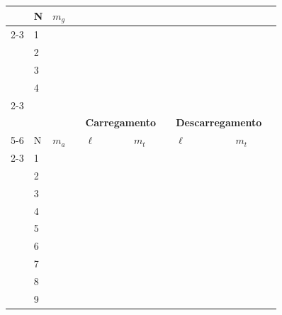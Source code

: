 \begin{table}
	\begin{center}
		\begin{tabular}{llp{25mm}lp{25mm}p{25mm}lp{25mm}p{25mm}l}
		\toprule
		& N\textordmasculine & \textbf{$m_g$} & \\
		\cmidrule{2-3}
		& 1 & \cellcolor[gray]{0.89} \\
		& 2 & \cellcolor[gray]{0.95} \\
		& 3 & \cellcolor[gray]{0.89} \\
		& 4 & \cellcolor[gray]{0.95} \\
		\cmidrule{2-3}
\\
		& & & & \multicolumn{2}{c}{\textbf{Carregamento}} & & \multicolumn{2}{c}{\textbf{Descarregamento}} \\
		\cmidrule{5-6} \cmidrule{8-9}
		& N\textordmasculine & \textbf{$m_a$} & & $\ell$ & \multicolumn{1}{c}{$m_t$} & & $\ell$ & \multicolumn{1}{c}{$m_t$} \\
		\cmidrule{2-3} \cmidrule{5-6} \cmidrule{8-9}
		&  1 & \cellcolor[gray]{0.89} & & \cellcolor[gray]{0.89} & \cellcolor[gray]{0.92} & & \cellcolor[gray]{0.89} & \cellcolor[gray]{0.92} & \\
		&  2 & \cellcolor[gray]{0.95} & & \cellcolor[gray]{0.95} & \cellcolor[gray]{0.97} & & \cellcolor[gray]{0.95} & \cellcolor[gray]{0.97} & \\
		&  3 & \cellcolor[gray]{0.89} & & \cellcolor[gray]{0.89} & \cellcolor[gray]{0.92} & & \cellcolor[gray]{0.89} & \cellcolor[gray]{0.92} & \\
		&  4 & \cellcolor[gray]{0.95} & & \cellcolor[gray]{0.95} & \cellcolor[gray]{0.97} & & \cellcolor[gray]{0.95} & \cellcolor[gray]{0.97} & \\
		&  5 & \cellcolor[gray]{0.89} & & \cellcolor[gray]{0.89} & \cellcolor[gray]{0.92} & & \cellcolor[gray]{0.89} & \cellcolor[gray]{0.92} & \\
		&  6 & \cellcolor[gray]{0.95} & & \cellcolor[gray]{0.95} & \cellcolor[gray]{0.97} & & \cellcolor[gray]{0.95} & \cellcolor[gray]{0.97} & \\
		&  7 & \cellcolor[gray]{0.89} & & \cellcolor[gray]{0.89} & \cellcolor[gray]{0.92} & & \cellcolor[gray]{0.89} & \cellcolor[gray]{0.92} & \\
		&  8 & \cellcolor[gray]{0.95} & & \cellcolor[gray]{0.95} & \cellcolor[gray]{0.97} & & \cellcolor[gray]{0.95} & \cellcolor[gray]{0.97} & \\
		&  9 & \cellcolor[gray]{0.89} & & \cellcolor[gray]{0.89} & \cellcolor[gray]{0.92} & & \cellcolor[gray]{0.89} & \cellcolor[gray]{0.92} & \\

\end{tabular}
\end{center}
\end{table}
